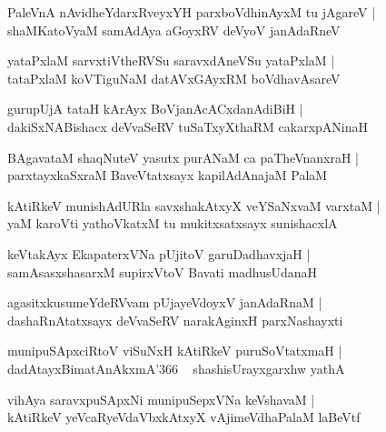 \documentclass[twoside,12pt,openright]{book}
\newcounter{shloka}[chapter]
\begin{document}
\begin{shloka}%
PaleVnA nAvidheYdarxRveyxYH parxboVdhinAyxM tu jAgareV |\\
shaMKatoVyaM samAdAya aGoyxRV deVyoV janAdaRneV 
\end{shloka}

\begin{shloka}%
yataPxlaM sarvxtiVtheRVSu saravxdAneVSu yataPxlaM |\\
tataPxlaM koVTiguNaM datAVxGAyxRM boVdhavAsareV
\end{shloka}

\begin{shloka}%
gurupUjA tataH kArAyx BoVjanAcACxdanAdiBiH |\\
dakiSxNABishacx deVvaSeRV tuSaTxyXthaRM cakarxpANinaH 
\end{shloka}

\begin{shloka}%
BAgavataM shaqNuteV yasutx purANaM ca paTheVnanxraH |\\
parxtayxkaSxraM BaveVtatxsayx kapilAdAnajaM PalaM
\end{shloka}

\begin{shloka}%
kAtiRkeV munishAdURla savxshakAtxyX veYSaNxvaM varxtaM |\\
yaM karoVti yathoVkatxM tu mukitxsatxsayx sunishacxlA 
\end{shloka}

\begin{shloka}%
keVtakAyx EkapaterxVNa pUjitoV garuDadhavxjaH |\\
samAsasxshasarxM supirxVtoV Bavati madhusUdanaH 
\end{shloka}

\begin{shloka}%
agasitxkusumeYdeRVvam pUjayeVdoyxV janAdaRnaM |\\
dashaRnAtatxsayx deVvaSeRV narakAginxH parxNashayxti 
\end{shloka}

\begin{shloka}%
munipuSApxciRtoV viSuNxH kAtiRkeV puruSoVtatxmaH |\\
dadAtayxBimatAnAkxmA\char'366 ~ shashisUrayxgarxhw yathA 
\end{shloka}

\begin{shloka}%
vihAya saravxpuSApxNi munipuSepxVNa keVshavaM |\\
kAtiRkeV yeVcaRyeVdaVbxkAtxyX vAjimeVdhaPalaM laBeVtf
\end{shloka}
\end{document}
